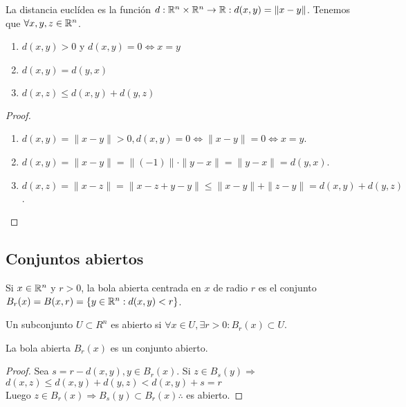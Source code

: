 \begin{definition}
  La distancia euclídea es la función \(d: \mathbb{R}^n \times \mathbb{R}^n \to \mathbb{R} : d(x, y) = \|x-y\| \).
  Tenemos que \(\forall x,y,z \in \mathbb{R}^n\).
  \begin{enumerate}
    \item \(d(x, y) > 0\) y \(d(x, y) = 0 \iff x=y\)
    \item \(d(x, y) = d(y, x)\)
    \item \(d(x, z) \leq d(x, y) + d(y, z)\)
  \end{enumerate}
  \begin{proof}
    \begin{enumerate}
      \item \(d(x, y) = \|x-y\| > 0, d(x, y) = 0 \iff \|x-y\| = 0 \iff x = y \).
      \item \(d(x, y) = \|x-y\| = \|(-1)\| \cdot \|y-x\| = \|y-x\| = d(y, x)\).
      \item \(d(x, z) = \|x-z\| = \|x-z+y-y\| \leq \|x-y\| + \|z-y\| = d(x, y) + d(y, z)\).
    \end{enumerate}
  \end{proof}
\end{definition}

\subsection{Conjuntos abiertos}
\begin{definition}
  Si \(x \in \mathbb{R}^n\) y \(r > 0\), la bola abierta centrada en \(x\) de radio \(r\) es el conjunto \(B_r(x) = B(x,r) = \{ y \in \mathbb{R}^n : d(x, y) < r \} \).
\end{definition}

\begin{definition}
  Un subconjunto \(U \subset R^n\) es abierto si \(\forall x \in U, \exists r > 0 : B_r(x) \subset U\).
\end{definition}

\begin{lemma}
  La bola abierta \(B_r(x)\) es un conjunto abierto.
  \begin{proof}
    Sea \(s = r - d(x, y), y \in B_r(x)\). Si \(z \in B_s(y) \Rightarrow \) \\
    \(d(x, z) \leq d(x, y) + d(y, z) < d(x, y) + s = r\) \\
    Luego \(z \in B_r(x) \Rightarrow B_s(y) \subset B_r(x) \therefore \) es abierto.
  \end{proof}
\end{lemma}

